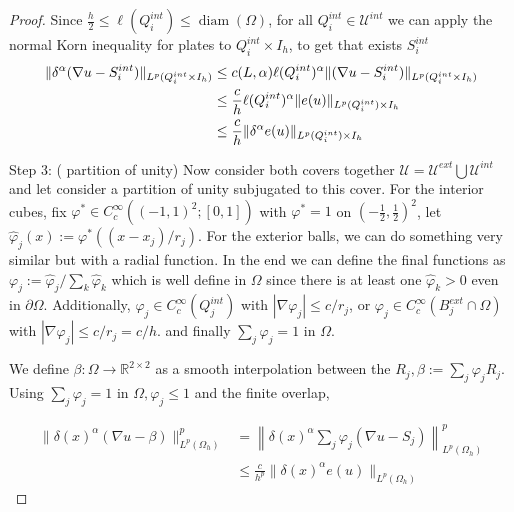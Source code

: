 \begin{proof}
Since $\frac{h}{2}\leq\ell(Q_i^{int})\leq \operatorname{diam}(\Omega)$, for all $Q_i^{int}\in \mathcal{U}^{int}$ we can apply the normal Korn inequality for plates to $Q_i^{int}\times I_h$, to get that exists $S^{int}_i$ 
\begin{align*}
    \|\delta^\alpha(\nabla u -S^{int}_i)\|_{L^p(Q_i^{int}\times I_h)}&\leq  c(L,\alpha)\ell(Q_i^{int})^\alpha\|(\nabla u -S^{int}_i)\|_{L^p(Q_i^{int}\times I_h)}\\
    &\leq\frac{c}{h}\ell(Q_i^{int})^{\alpha}\| e(u)\|_{L^p(Q_i^{int})\times I_h}\\
    &\leq \frac{c}{h}\|\delta^\alpha e(u)\|_{L^p(Q_i^{int})\times I_h}
\end{align*}

Step 3: ( partition of unity) Now consider both covers together $\mathcal{U}=\mathcal{U}^{ext}\bigcup\mathcal{U}^{int}$ and let consider a partition of unity subjugated to this cover. For the interior cubes, fix $\varphi^* \in C_c^{\infty}\left((-1,1)^2 ;[0,1]\right)$ with $\varphi^*=1$ on $\left(-\frac{1}{2}, \frac{1}{2}\right)^2$, let $\hat{\varphi}_j(x):=\varphi^*\left(\left(x-x_j\right) / r_j\right)$. For the exterior balls, we can do something very similar but with a radial function. In the end we can define the final functions as $\varphi_j:=\hat{\varphi}_j / \sum_k \hat{\varphi}_k$ which is well define in $\Omega$ since there is at least one $\hat{\varphi}_k>0$ even in $\partial\Omega$. Additionally, $\varphi_j \in C_c^{\infty}\left(Q^{int}_j\right)$ with $\left|\nabla \varphi_j\right| \leq c / r_j$, or $\varphi_j \in C_c^{\infty}\left(B^{ext}_j\cap \Omega\right)$ with $\left|\nabla \varphi_j\right| \leq c / r_j = c/h$.  and  finally $ \sum_j \varphi_j=1$ in $\Omega$.

We define $\beta: \Omega \rightarrow \mathbb{R}^{2 \times 2}$ as a smooth interpolation between the $R_j, \beta:=\sum_j \varphi_j R_j$. Using $\sum_j \varphi_j=1$ in $\Omega, \varphi_j \leq 1$ and the finite overlap,

\begin{align*}
\|\delta(x)^\alpha(\nabla u-\beta)\|_{L^p(\Omega_h)}^p&=\left\|\delta(x)^\alpha\sum_j \varphi_j\left(\nabla u-S_j\right)\right\|_{L^p(\Omega_h)}^p \\ 
& \leq  \frac{c}{h^p} \|\delta(x)^\alpha e(u)\|_{L^p(\Omega_h)}
\end{align*}


\end{proof}
